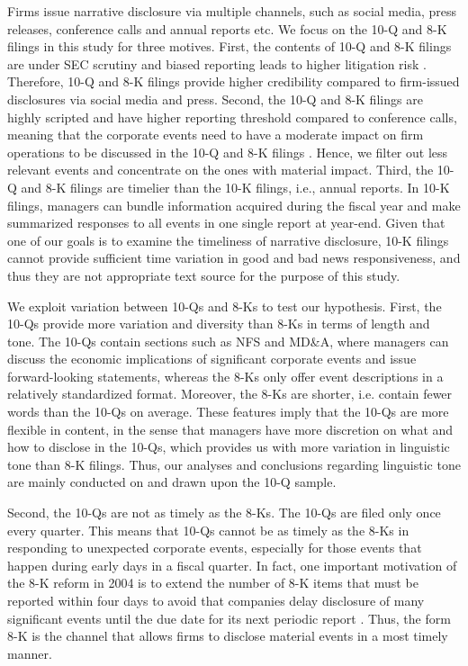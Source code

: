 \documentclass[letterpaper,12pt]{article}
\begin{document}
\begin{spacing}{1.5}
Firms issue narrative disclosure via multiple channels, such as social media, press releases, conference calls and annual reports etc. We focus on the 10-Q and 8-K filings in this study for three motives. First, the contents of 10-Q and 8-K filings are under SEC scrutiny and biased reporting leads to higher litigation risk \cite{rogersDisclosureToneShareholder2011}. Therefore, 10-Q and 8-K filings provide higher credibility compared to firm-issued disclosures via social media and press. Second, the 10-Q and 8-K filings are highly scripted and have higher reporting threshold compared to conference calls, meaning that the corporate events need to have a moderate impact on firm operations to be discussed in the 10-Q and 8-K filings \cite{hassanFirmLevelPoliticalRisk2019}. Hence, we filter out less relevant events and concentrate on the ones with material impact. Third, the 10-Q and 8-K filings are timelier than the 10-K filings, i.e., annual reports. In 10-K filings, managers can bundle information acquired during the fiscal year and make summarized responses to all events in one single report at year-end. Given that one of our goals is to examine the timeliness of narrative disclosure, 10-K filings cannot provide sufficient time variation in good and bad news responsiveness, and thus they are not appropriate text source for the purpose of this study.

We exploit variation between 10-Qs and 8-Ks to test our hypothesis. First, the 10-Qs provide more variation and diversity than 8-Ks in terms of length and tone. The 10-Qs contain sections such as NFS and MD\&A, where managers can discuss the economic implications of significant corporate events and issue forward-looking statements, whereas the 8-Ks only offer event descriptions in a relatively standardized format. Moreover, the 8-Ks are shorter, i.e. contain fewer words than the 10-Qs on average. These features imply that the 10-Qs are more flexible in content, in the sense that managers have more discretion on what and how to disclose in the 10-Qs, which provides us with more variation in linguistic tone than 8-K filings. Thus, our analyses and conclusions regarding linguistic tone are mainly conducted on and drawn upon the 10-Q sample. 

Second, the 10-Qs are not as timely as the 8-Ks. The 10-Qs are filed only once every quarter. This means that 10-Qs cannot be as timely as the 8-Ks in responding to unexpected corporate events, especially for those events that happen during early days in a fiscal quarter. In fact, one important motivation of the 8-K reform in 2004 is to extend the number of 8-K items that must be reported within four days to avoid that companies delay disclosure of many significant events until the due date for its next periodic report \cite{secFinalRuleAdditional2004}. Thus, the form 8-K is the channel that allows firms to disclose material events in a most timely manner.


\end{spacing}
\end{document}
